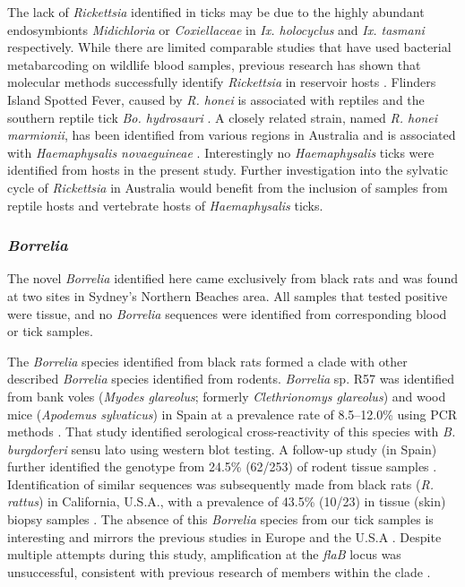 \documentclass[a4paper, nobind]{templates/ociamthesis}
\begin{document}
The lack of \emph{Rickettsia} identified in ticks may be due to the highly abundant endosymbionts \emph{Midichloria} or \emph{Coxiellaceae} in \emph{Ix. holocyclus} and \emph{Ix. tasmani} respectively.
While there are limited comparable studies that have used bacterial metabarcoding on wildlife blood samples, previous research has shown that molecular methods successfully identify \emph{Rickettsia} in reservoir hosts \autocite{ndeerehMolecularSurveillanceSpotted2017,martelloBorreliaBurgdorferiSensu2019,chaorattanakaweeAmpliconBasedNextGeneration2021}. Flinders Island Spotted Fever, caused by \emph{R. honei} is associated with reptiles and the southern reptile tick \emph{Bo. hydrosauri} \autocite{stenosAponommaHydrosauriReptileassociated2003}.
A closely related strain, named \emph{R. honei marmionii}, has been identified from various regions in Australia and is associated with \emph{Haemaphysalis novaeguineae} \autocite{laneEvidenceSpottedFeverlike2005a,unsworthFlindersIslandSpotted2007}.
Interestingly no \emph{Haemaphysalis} ticks were identified from hosts in the present study.
Further investigation into the sylvatic cycle of \emph{Rickettsia} in Australia would benefit from the inclusion of samples from reptile hosts and vertebrate hosts of \emph{Haemaphysalis} ticks.

\hypertarget{borrelia-3}{%
\subsubsection{\texorpdfstring{\emph{Borrelia}}{Borrelia}}\label{borrelia-3}}

The novel \emph{Borrelia} identified here came exclusively from black rats and was found at two sites in Sydney's Northern Beaches area. All samples that tested positive were tissue, and no \emph{Borrelia} sequences were identified from corresponding blood or tick samples.

The \emph{Borrelia} species identified from black rats formed a clade with other described \emph{Borrelia} species identified from rodents. \emph{Borrelia} sp. R57 was identified from bank voles (\emph{Myodes glareolus}; formerly \emph{Clethrionomys glareolus}) and wood mice (\emph{Apodemus sylvaticus}) in Spain at a prevalence rate of 8.5--12.0\% using PCR methods \autocite{gilIdentificationNewBorrelia2005}.
That study identified serological cross-reactivity of this species with \emph{B. burgdorferi} sensu lato using western blot testing.
A follow-up study (in Spain) further identified the genotype from 24.5\% (62/253) of rodent tissue samples \autocite{barandikaTickBorneZoonoticBacteria2007}.
Identification of similar sequences was subsequently made from black rats (\emph{R. rattus}) in California, U.S.A., with a prevalence of 43.5\% (10/23) in tissue (skin) biopsy samples \autocite{fedorovaRemarkableDiversityTick2014}.
The absence of this \emph{Borrelia} species from our tick samples is interesting and mirrors the previous studies in Europe and the U.S.A \autocite{gilIdentificationNewBorrelia2005,fedorovaRemarkableDiversityTick2014}.
Despite multiple attempts during this study, amplification at the \emph{flaB} locus was unsuccessful, consistent with previous research of members within the clade \autocite{gilIdentificationNewBorrelia2005}.
\end{document}
